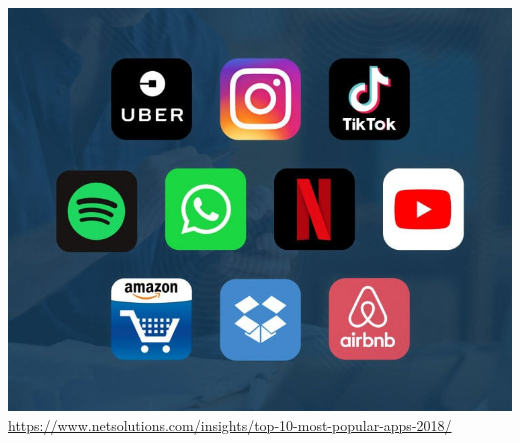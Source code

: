 \begin{frame}
\begin{columns}
\begin{center}
\includegraphics[width=0.95\linewidth]{00_IntroProgramacionYMoviles/most-popular-apps.jpg} 
\tiny{\url{https://www.netsolutions.com/insights/top-10-most-popular-apps-2018/}}  
\end{center}
\end{columns}
\end{frame}



